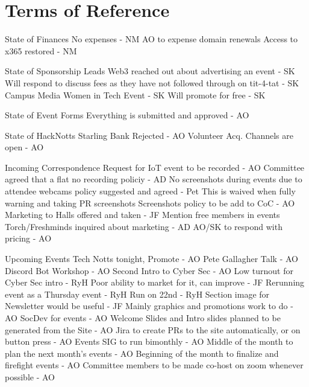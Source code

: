 \documentclass[11pt,hacksoc]{meetingmins}
\begin{document}
\section{Terms of Reference}
\begin{items}
\item {State of Finances}
  \subitem No expenses - NM
  \subitem AO to expense domain renewals
  \subitem Access to x365 restored - NM
\item {State of Sponsorship Leads}
  \subitem Web3 reached out about advertising an event - SK
    \subsubitem Will respond to discuss fees as they have not followed through on tit-4-tat - SK
  \subitem Campus Media Women in Tech Event - SK
    \subsubitem Will promote for free - SK
\item {State of Event Forms}
  \subitem Everything is submitted and approved - AO
\item {State of HackNotts}
  \subitem Starling Bank Rejected - AO
  \subitem Volunteer Acq. Channels are open - AO
\item {Incoming Correspondence}
  \subitem Request for IoT event to be recorded - AO
  \subitem Committee agreed that a flat no recording policiy - AD
  \subitem No screenshots during events due to attendee webcams policy suggested and agreed - Pet
    \subsubitem This is waived when fully warning and taking PR screenshots
    \subsubitem Screenshots policy to be add to CoC - AO
  \subitem Marketing to Halls offered and taken - JF
    \subsubitem Mention free members in events
  \subitem Torch/Freshminds inquired about marketing - AD
    \subsubitem AO/SK to respond with pricing - AO
\item {Upcoming Events}
  \subitem Tech Notts tonight, Promote - AO
  \subitem Pete Gallagher Talk - AO
  \subitem Discord Bot Workshop - AO
  \subitem Second Intro to Cyber Sec - AO
    \subsubitem Low turnout for Cyber Sec intro - RyH
    \subsubitem Poor ability to market for it, can improve - JF
    \subsubitem Rerunning event as a Thursday event - RyH
    \subsubitem Run on 22nd - RyH
    \subsubitem Section image for Newsletter would be useful - JF
  \subitem Mainly graphics and promotions work to do - AO
  \subitem SocDev for events - AO
    \subsubitem Welcome Slides and Intro slides planned to be generated from the Site - AO
    \subsubitem Jira to create PRs to the site automatically, or on button press - AO
  \subitem Events SIG to run bimonthly - AO
    \subsubitem Middle of the month to plan the next month's events - AO
    \subsubitem Beginning of the month to finalize and firefight events - AO
  \subitem Committee members to be made co-host on zoom whenever possible - AO
\end{items}
\end{document}
